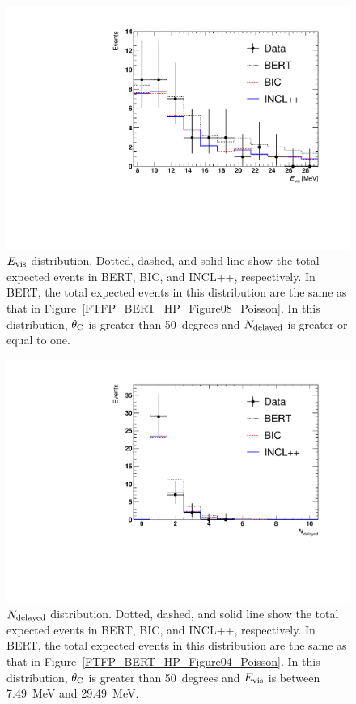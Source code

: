 \begin{figure}[b]
	\centering
	\includegraphics[width=12cm]{PDF/Figure08/Comparison_02/Figure08_Poisson}
	\caption[$E_{\rm vis}$ distribution]{
	$E_{\rm vis}$ distribution.
	Dotted, dashed, and solid line show the total expected events in BERT, BIC, and INCL++, respectively.
	In BERT, the total expected events in this distribution are the same as that in Figure~\ref{FTFP_BERT_HP_Figure08_Poisson}.
	In this distribution, $\theta_{\rm C}$ is greater than 50~degrees and $N_{\rm delayed}$ is greater or equal to one.
	}\label{Comparison_Figure08_Poisson}
\end{figure}

\begin{figure}[b]
	\centering
	\includegraphics[width=12cm]{PDF/Figure04/Comparison_02/Figure04_Poisson}
	\caption[$N_{\rm delayed}$ distribution]{
	$N_{\rm delayed}$ distribution.
	Dotted, dashed, and solid line show the total expected events in BERT, BIC, and INCL++, respectively.
	In BERT, the total expected events in this distribution are the same as that in Figure~\ref{FTFP_BERT_HP_Figure04_Poisson}.
	In this distribution, $\theta_{\rm C}$ is greater than 50~degrees and $E_{\rm vis}$ is between 7.49~MeV and 29.49~MeV.
	}\label{Comparison_Figure04_Poisson}
\end{figure}

